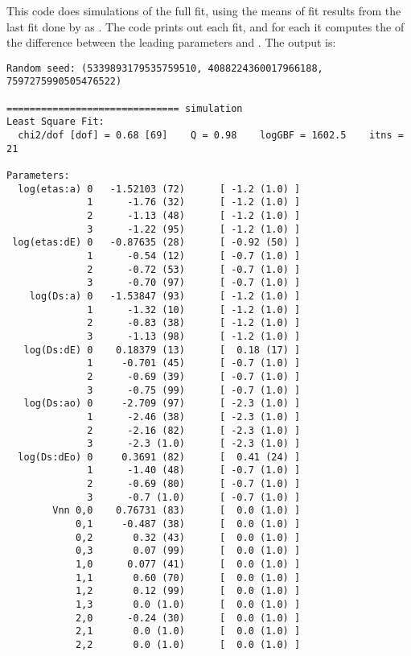\documentclass[letterpaper,10pt,english]{sphinxmanual}
\begin{document}
\begin{itemize}
This code does  simulations of the full fit, using the means of fit
results from the last fit done by  as .
The code prints out each fit,
and for each it computes the  of the difference between the leading
parameters and . The output is:

\begin{Verbatim}[commandchars=\\\{\}]
Random seed: (5339893179535759510, 4088224360017966188, 7597275990505476522)

============================== simulation
Least Square Fit:
  chi2/dof [dof] = 0.68 [69]    Q = 0.98    logGBF = 1602.5    itns = 21

Parameters:
  log(etas:a) 0   -1.52103 (72)      [ -1.2 (1.0) ]  
              1      -1.76 (32)      [ -1.2 (1.0) ]  
              2      -1.13 (48)      [ -1.2 (1.0) ]  
              3      -1.22 (95)      [ -1.2 (1.0) ]  
 log(etas:dE) 0   -0.87635 (28)      [ -0.92 (50) ]  
              1      -0.54 (12)      [ -0.7 (1.0) ]  
              2      -0.72 (53)      [ -0.7 (1.0) ]  
              3      -0.70 (97)      [ -0.7 (1.0) ]  
    log(Ds:a) 0   -1.53847 (93)      [ -1.2 (1.0) ]  
              1      -1.32 (10)      [ -1.2 (1.0) ]  
              2      -0.83 (38)      [ -1.2 (1.0) ]  
              3      -1.13 (98)      [ -1.2 (1.0) ]  
   log(Ds:dE) 0    0.18379 (13)      [  0.18 (17) ]  
              1     -0.701 (45)      [ -0.7 (1.0) ]  
              2      -0.69 (39)      [ -0.7 (1.0) ]  
              3      -0.75 (99)      [ -0.7 (1.0) ]  
   log(Ds:ao) 0     -2.709 (97)      [ -2.3 (1.0) ]  
              1      -2.46 (38)      [ -2.3 (1.0) ]  
              2      -2.16 (82)      [ -2.3 (1.0) ]  
              3      -2.3 (1.0)      [ -2.3 (1.0) ]  
  log(Ds:dEo) 0     0.3691 (82)      [  0.41 (24) ]  
              1      -1.40 (48)      [ -0.7 (1.0) ]  
              2      -0.69 (80)      [ -0.7 (1.0) ]  
              3      -0.7 (1.0)      [ -0.7 (1.0) ]  
        Vnn 0,0    0.76731 (83)      [  0.0 (1.0) ]  
            0,1     -0.487 (38)      [  0.0 (1.0) ]  
            0,2       0.32 (43)      [  0.0 (1.0) ]  
            0,3       0.07 (99)      [  0.0 (1.0) ]  
            1,0      0.077 (41)      [  0.0 (1.0) ]  
            1,1       0.60 (70)      [  0.0 (1.0) ]  
            1,2       0.12 (99)      [  0.0 (1.0) ]  
            1,3       0.0 (1.0)      [  0.0 (1.0) ]  
            2,0      -0.24 (30)      [  0.0 (1.0) ]  
            2,1       0.0 (1.0)      [  0.0 (1.0) ]  
            2,2       0.0 (1.0)      [  0.0 (1.0) ]  

\end{Verbatim}
\end{itemize}
\end{document}
